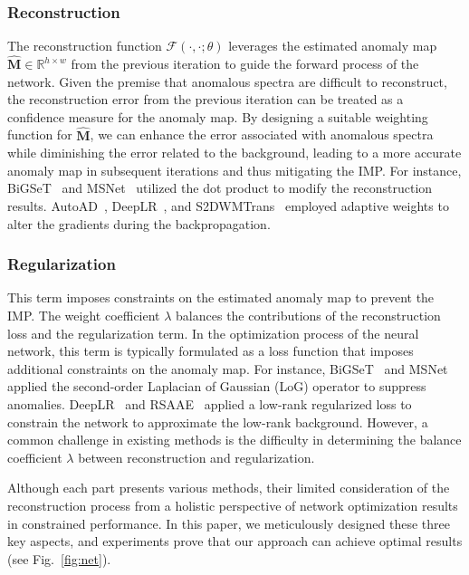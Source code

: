 \subsubsection{Reconstruction}

The reconstruction function $\mathcal{F}(\cdot,\cdot;\theta)$ leverages the estimated anomaly map $\hat{\mathbf{M}} \in \mathbb{R}^{h \times w}$ from the previous iteration to guide the forward process of the network. Given the premise that anomalous spectra are difficult to reconstruct, the reconstruction error from the previous iteration can be treated as a confidence measure for the anomaly map. By designing a suitable weighting function for $\hat{\mathrm{\mathbf{M}}}$, we can enhance the error associated with anomalous spectra while diminishing the error related to the background, leading to a more accurate anomaly map in subsequent iterations and thus mitigating the IMP. For instance, BiGSeT~\cite{BiGSeT} and MSNet~\cite{MSNet} utilized the dot product to modify the reconstruction results. AutoAD~\cite{AutoAD}, DeepLR~\cite{DeepLR}, and S2DWMTrans~\cite{S2DWMTrans} employed adaptive weights to alter the gradients during the backpropagation.



\subsubsection{Regularization}

This term imposes constraints on the estimated anomaly map to prevent the IMP. The weight coefficient $\lambda$ balances the contributions of the reconstruction loss and the regularization term. In the optimization process of the neural network, this term is typically formulated as a loss function that imposes additional constraints on the anomaly map. For instance, BiGSeT~\cite{BiGSeT} and MSNet~\cite{MSNet} applied the second-order Laplacian of Gaussian (LoG) operator to suppress anomalies. DeepLR~\cite{DeepLR} and RSAAE~\cite{RSAAE} applied a low-rank regularized loss to constrain the network to approximate the low-rank background. However, a common challenge in existing methods is the difficulty in determining the balance coefficient $\lambda$ between reconstruction and regularization.

Although each part presents various methods, their limited consideration of the reconstruction process from a holistic perspective of network optimization results in constrained performance. In this paper, we meticulously designed these three key aspects, and experiments prove that our approach can achieve optimal results (see Fig.~\ref{fig:net}).



